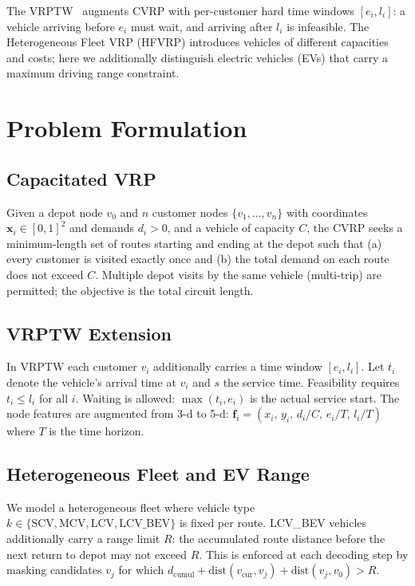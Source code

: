 \documentclass[conference]{IEEEtran}
\begin{document}
The VRPTW~\cite{solomon1987algorithms} augments CVRP with per-customer hard
time windows $[e_i, l_i]$: a vehicle arriving before $e_i$ must wait, and
arriving after $l_i$ is infeasible. The Heterogeneous Fleet VRP (HFVRP)
introduces vehicles of different capacities and costs; here we additionally
distinguish electric vehicles (EVs) that carry a maximum driving range
constraint.

\section{Problem Formulation}

\subsection{Capacitated VRP}

Given a depot node $v_0$ and $n$ customer nodes $\{v_1,\ldots,v_n\}$ with
coordinates $\mathbf{x}_i \in [0,1]^2$ and demands $d_i > 0$, and a vehicle
of capacity $C$, the CVRP seeks a minimum-length set of routes starting and
ending at the depot such that (a) every customer is visited exactly once and
(b) the total demand on each route does not exceed $C$. Multiple depot visits
by the same vehicle (multi-trip) are permitted; the objective is the total
circuit length.

\subsection{VRPTW Extension}

In VRPTW each customer $v_i$ additionally carries a time window
$[e_i, l_i]$. Let $t_i$ denote the vehicle's arrival time at $v_i$ and
$s$ the service time. Feasibility requires $t_i \le l_i$ for all $i$.
Waiting is allowed: $\max(t_i, e_i)$ is the actual service start. The node
features are augmented from 3-d to 5-d:
$\mathbf{f}_i = (x_i,\, y_i,\, d_i/C,\, e_i/T,\, l_i/T)$
where $T$ is the time horizon.

\subsection{Heterogeneous Fleet and EV Range}

We model a heterogeneous fleet where vehicle type $k \in
\{\text{SCV}, \text{MCV}, \text{LCV}, \text{LCV\_BEV}\}$ is fixed per route.
LCV\_BEV vehicles additionally carry a range limit $R$: the accumulated
route distance before the next return to depot may not exceed $R$. This is
enforced at each decoding step by masking candidates $v_j$ for which
$d_{\text{cumul}} + \text{dist}(v_{\text{cur}}, v_j) +
\text{dist}(v_j, v_0) > R$.
\end{document}
